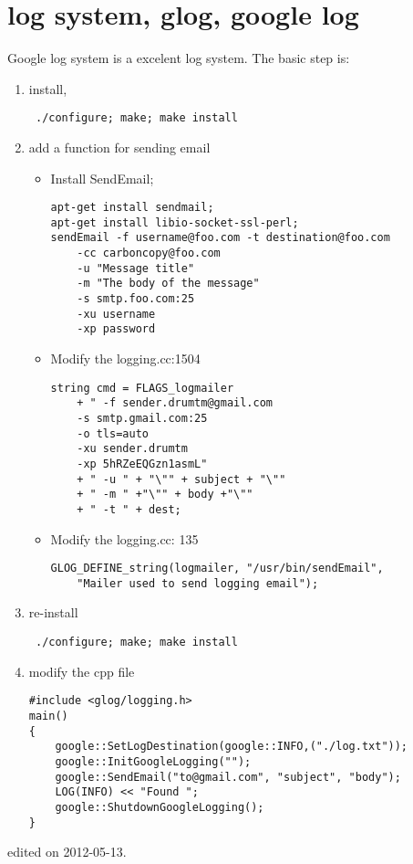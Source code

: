 \section{log system, glog, google log}
Google log system is a excelent log system. The basic step is:
\begin{enumerate}
\item install, \begin{verbatim} ./configure; make; make install \end{verbatim}
\item add a function for sending email
\begin{itemize}
\item Install SendEmail; 
\begin{verbatim}apt-get install sendmail; 
apt-get install libio-socket-ssl-perl;
sendEmail -f username@foo.com -t destination@foo.com 
    -cc carboncopy@foo.com 
    -u "Message title" 
    -m "The body of the message" 
    -s smtp.foo.com:25 
    -xu username 
    -xp password \end{verbatim} 
\item Modify the logging.cc:1504
\begin{verbatim}string cmd = FLAGS_logmailer 
    + " -f sender.drumtm@gmail.com 
    -s smtp.gmail.com:25 
    -o tls=auto 
    -xu sender.drumtm 
    -xp 5hRZeEQGzn1asmL" 
    + " -u " + "\"" + subject + "\"" 
    + " -m " +"\"" + body +"\"" 
    + " -t " + dest; 
    \end{verbatim} 
\item Modify the logging.cc: 135 
\begin{verbatim}
GLOG_DEFINE_string(logmailer, "/usr/bin/sendEmail", 
    "Mailer used to send logging email"); 
\end{verbatim}
\end{itemize} 
\item re-install
\begin{verbatim} ./configure; make; make install \end{verbatim}
\item modify the cpp file
\begin{verbatim}
#include <glog/logging.h>
main()
{
    google::SetLogDestination(google::INFO,("./log.txt"));
    google::InitGoogleLogging("");
    google::SendEmail("to@gmail.com", "subject", "body");
    LOG(INFO) << "Found ";
    google::ShutdownGoogleLogging();
}\end{verbatim}
\end{enumerate}
\hfill {\tiny  edited on 2012-05-13.}
%

